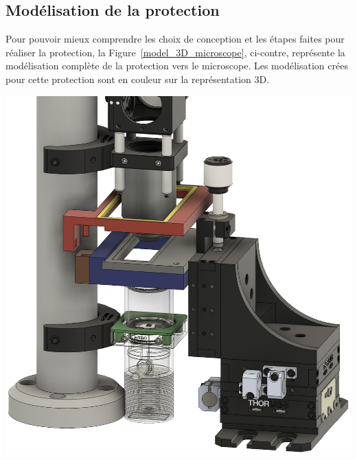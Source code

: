 \subsection{Modélisation de la protection}
\begin{minipage}[c]{0.38\textwidth}
    Pour pouvoir mieux comprendre les choix de conception et les étapes faites pour réaliser la protection, la Figure~\ref{model_3D_microscope}, ci-contre, représente la modélisation complète de la protection vers le microscope. Les modélisation crées pour cette protection sont en couleur sur la représentation 3D.
\end{minipage}\hfill
\begin{minipage}[c]{0.58\textwidth}
    \begin{center}
        \includegraphics[width=\textwidth]{assets/figures/Protections_laser/Securite_mecanique/Protection_vers_microscope/model_3D.jpeg}
    \end{center}
    \label{model_3D_microscope}
\end{minipage}


